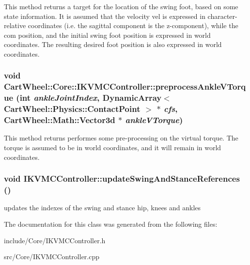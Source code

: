 This method returns a target for the location of the swing foot, based on some state information. It is assumed that the velocity vel is expressed in character-\/relative coordinates (i.e. the sagittal component is the z-\/component), while the com position, and the initial swing foot position is expressed in world coordinates. The resulting desired foot position is also expressed in world coordinates. \hypertarget{classCartWheel_1_1Core_1_1IKVMCController_a9fed3d9a11852843f5847d0627447577}{
\subsubsection[{preprocessAnkleVTorque}]{\setlength{\rightskip}{0pt plus 5cm}void CartWheel::Core::IKVMCController::preprocessAnkleVTorque (int {\em ankleJointIndex}, \/  DynamicArray$<$ {\bf CartWheel::Physics::ContactPoint} $>$ $\ast$ {\em cfs}, \/  {\bf CartWheel::Math::Vector3d} $\ast$ {\em ankleVTorque})}}
\label{classCartWheel_1_1Core_1_1IKVMCController_a9fed3d9a11852843f5847d0627447577}
This method returns performes some pre-\/processing on the virtual torque. The torque is assumed to be in world coordinates, and it will remain in world coordinates. \hypertarget{classCartWheel_1_1Core_1_1IKVMCController_a2013dc539ffd677c3e3e7f890290eed0}{
\subsubsection[{updateSwingAndStanceReferences}]{\setlength{\rightskip}{0pt plus 5cm}void IKVMCController::updateSwingAndStanceReferences ()}}
\label{classCartWheel_1_1Core_1_1IKVMCController_a2013dc539ffd677c3e3e7f890290eed0}
updates the indexes of the swing and stance hip, knees and ankles 

The documentation for this class was generated from the following files:\begin{DoxyCompactItemize}
\item 
include/Core/IKVMCController.h\item 
src/Core/IKVMCController.cpp\end{DoxyCompactItemize}
